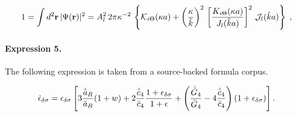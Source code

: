 \documentclass[11pt]{article}
\begin{document}
\begin{align*}1 = \int d^{2} {\bf r} \, | \Psi({\bf r})|^2 =A_{l}^{2} \, 2\pi \kappa^{-2} \, \left\{{\mathcal K}_{i \Theta} (\kappa a) + \left( \frac{\kappa }{\tilde{k} } \right)^{2}\,\left[\frac{K_{i \Theta} (\kappa a) }{J_{l} ( \tilde{k} a ) } \right]^{2}\,{\mathcal J_{l}}( \tilde{k} a ) \right\}\; ,\end{align*}

\paragraph{Expression 5.} The following expression is taken from a source-backed formula corpus.

\begin{align*}\dot{\epsilon}_{\delta\sigma}=\epsilon_{\delta\sigma}\left[3{\dot{\bar{a}}_R\over\bar{a}_R}(1+w)+2{\dot{\bar{c}}_4\over\bar{c}_4}{{1+\epsilon_{\delta\sigma}}\over{1+\epsilon}}+\left({\dot{\bar{G}}_4\over\bar{G}_4}-4{\dot{\bar{c}}_4\over\bar{c}_4}\right)(1+\epsilon_{\delta\sigma})\right].\end{align*}
\end{document}
